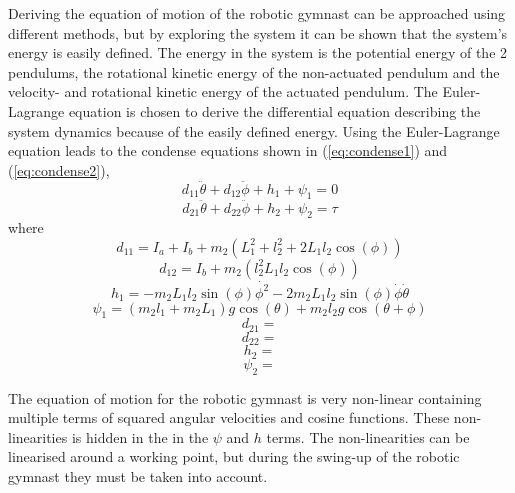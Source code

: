 \documentclass[a4paper,12pt]{article}
\begin{document}
	Deriving the equation of motion of the robotic gymnast can be approached using different methods, but by exploring the system it can be shown that the system's energy is easily defined. The energy in the system is the potential energy of the 2 pendulums, the rotational kinetic energy of the non-actuated pendulum and the velocity- and rotational kinetic energy of the actuated pendulum. The Euler-Lagrange equation is chosen to derive the differential equation describing the system dynamics because of the easily defined energy. Using the Euler-Lagrange equation leads to the condense equations shown in (\ref{eq:condense1}) and (\ref{eq:condense2}),
	\begin{equation} \label{eq:condense1}
		d_{11}\ddot{\theta}+d_{12}\ddot{\phi} + h_{1} + \psi_{1} = 0
	\end{equation}
	\begin{equation} \label{eq:condense2}
			d_{21}\ddot{\theta} + d_{22}\ddot{\phi} + h_{2} + \psi_{2} = \tau
	\end{equation}
	where
		\begin{equation} \label{eq:d11}
	d_{11} = I_{a} + I_{b} + m_{2}(L_{1}^2 + l_{2}^2+2L_{1}l_{2}\cos(\phi))
	\end{equation}
		\begin{equation} \label{eq:d12}
	d_{12} = I_{b} +m_{2}(l_{2}^2 L_{1}l_{2}\cos(\phi))
	\end{equation}
		\begin{equation} \label{eq:h1}
	h_{1} = -m_{2}L_{1}l_{2}\sin(\phi)\dot{\phi^2}-2m_{2}L_{1}l_{2}\sin(\phi)\dot{\phi}\dot{\theta}
	\end{equation}
		\begin{equation} \label{eq:psi1}
	\psi_{1} = (m_{2}l_{1}+m_{2}L_{1})g\cos(\theta) + m_{2}l_{2}g\cos(\theta+\phi)
	\end{equation}
		\begin{equation} \label{eq:d21}
	d_{21}=
	\end{equation}
		\begin{equation} \label{eq:d22}
	d_{22}=
	\end{equation}
		\begin{equation} \label{eq:h2}
	h_{2}=
	\end{equation}
		\begin{equation} \label{eq:psi2}
	\psi_{2}=
	\end{equation}
	
	
	
	The equation of motion for the robotic gymnast is very non-linear containing multiple terms of squared angular velocities and cosine functions. These non-linearities is hidden in the in the $\psi$ and $h$ terms. The non-linearities can be linearised around a working point, but during the swing-up of the robotic gymnast they must be taken into account.
 
\end{document}

